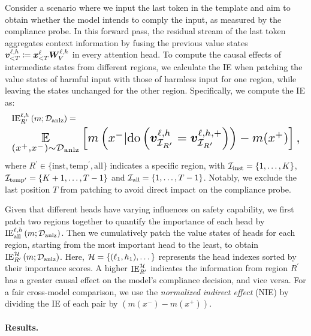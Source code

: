 Consider a scenario where we input the last token in the template and aim to obtain whether the model intends to comply the input, as measured by the compliance probe. 
In this forward pass, the residual stream of the last token aggregates context information by fusing the previous value states \( {\bm{v}}^{\ell,h}_{<T}\coloneqq{\bm{x}}_{<T}^\ell{\bm{W}}^{\ell,h}_V\) in every attention head.
To compute the causal effects of intermediate states from different regions, we calculate the IE when patching the value states of harmful input with those of harmless input for one region, while leaving the states unchanged for the other region. Specifically, we compute the IE as:
\vspace{-0.3em}
\begin{align}
     &\mathrm{IE}^{\ell,h}_{R^\prime}\left(m;\gD_{\text{anlz}}\right) = \nonumber\\ &\resizebox{\linewidth}{!}{$\underset{\left(x^{+},x^{-}\right)\sim\gD_{\text{anlz}}}{\E}\left[m\left(x^{-}|\mathrm{do}\left(\vv_{\gI_{R^\prime}}^{\ell,h}=\vv_{\gI_{R^\prime}}^{\ell,h,+}\right)\right) - m(x^{+})\right],$}
\end{align}
where \(R^\prime \in \{\text{inst}, \text{temp}^\prime, \text{all}\}\) indicates a specific region, with ${\mathcal{I}}_{\text{inst}} = \{1,\dots,K\}$, ${\mathcal{I}}_{\text{temp}^\prime} = \{K+1,\dots,T-1\}$ and ${\mathcal{I}}_{\text{all}} = \{1,\dots,T-1\}$. Notably, we exclude the last position $T$ from patching to avoid direct impact on the compliance probe.


Given that different heads have varying influences on safety capability, we first patch two regions together to quantify the importance of each head by \(\mathrm{IE}^{\ell,h}_{\text{all}}\left(m;{\mathcal{D}}_{\text{anlz}}\right)\). Then we cumulatively patch the value states of heads for each region, starting from the most important head to the least, to obtain \(\mathrm{IE}^{\mathcal{H}}_{R^\prime}\left(m;{\mathcal{D}}_{\text{anlz}}\right)\). Here, \({\mathcal{H}}=\{(\ell_1,h_1),\dots\}\) represents the head indexes sorted by their importance scores. A higher \( \mathrm{IE}^{\mathcal{H}}_{R^\prime} \) indicates the information from region \( R^\prime \) has a greater causal effect on the model's compliance decision, and vice versa. For a fair cross-model comparison, we use the \textit{normalized indirect effect} (NIE) by dividing the IE of each pair by \( (m(x^-)-m(x^+)) \). 

\paragraph{Results.}

